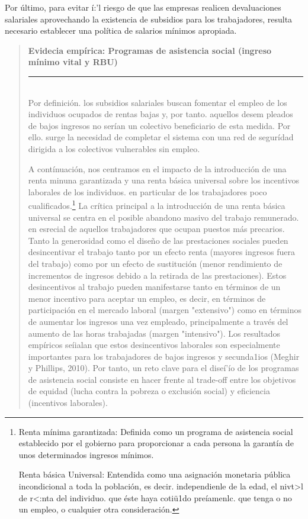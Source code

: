 \documentclass[10pt,a4paper]{article}
\newenvironment{specialblock}[1]{%
      \begin{quote} %
      \small %
      \noindent\textbf{#1}\\[-0.3em] %
      \rule{\linewidth}{0.4pt}\\[0.6em]}{
      \end{quote}}
\begin{document}
Por último, para evitar í:'l riesgo de que las empresas realicen devaluaciones salariales aprovechando la existencia de subsidios para los trabajadores, resulta necesario establecer una política de salarios mínimos apropiada.

\begin{specialblock}{Evidecia empírica: Programas de asistencia social (ingreso mínimo vital y RBU)}
    Por definición. los subsidios salariales buscan fomentar el empleo de los individuos ocupados de rentas bajas y, por tanto. aquellos desem pleados de bajos ingresos no serían un colectivo beneficiario de esta medida. Por ello. surge la necesidad de completar el sistema con una red de segurídad dirigida a los colectivos vulnerables sin empleo. 
    
    A contínuación, nos centramos en el impacto de la introducción de una renta minuna garantizada y una renta básica universal sobre los incentivos laborales de los individuos. en particular de los trabajadores poco cualificados.\footnote{%
        Renta mínima garantizada: Definida como un programa de asistencia social establecido por el gobierno para proporcionar a cada persona la garantía de unos determinados ingresos mínimos.

    Renta básica Universal: Entendida como una asignación monetaria pública incondicional a toda la población, es decir. independienle de la edad, el nivt>l de r<:nta del individuo. que éste haya cotiü1do pre\'iamenlc. que tenga o no un empleo, o cualquier otra consideración.
    } La crítica principal a la introducción de una renta básica universal se centra en el posible abandono masivo del trabajo remunerado. en esrecial de aquellos trabajadores que ocupan puestos más precarios. Tanto la generosidad como el diseño de las prestaciones sociales pueden desincentivar el trabajo tanto por un efecto renta (mayores ingresos fuera del trabajo) como por un efecto de sustitución (menor rendimiento de incrementos de ingresos debido a la retirada de las prestaciones). Estos desincentivos al trabajo pueden manifestarse tanto en términos de un menor incentivo para aceptar un empleo, es decir, en términos de participación en el mercado laboral (margen "extensivo") como en términos de aumentar los ingresos una vez empleado, principalmente a través del aumento de las horas trabajadas (margen "intensivo"). Los resultados empíricos seíialan que estos desincentivos laborales son especialmente importantes para los trabajadores de bajos ingresos y secunda1ios (Meghir y Phillips, 2010). Por tanto, un reto clave para el diseí'ío de los programas de asistencia social consiste en hacer frente al trade-off entre los objetivos de equidad (lucha contra la pobreza o exclusión social) y eficiencia (incentivos laborales).


\end{specialblock}
\end{document}
